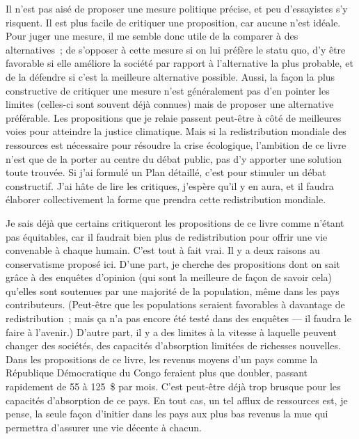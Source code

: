 \documentclass[a5paper,french,openany]{memoir}
\begin{document}
Il n'est pas aisé de proposer une mesure politique précise, et peu d'essayistes s'y risquent. Il est plus facile de critiquer une proposition, car aucune n'est idéale. Pour juger une mesure, il me semble donc utile de la comparer à des alternatives~; de s'opposer à cette mesure si on lui préfère le statu quo, d'y être favorable si elle améliore la société par rapport à l'alternative la plus probable, et de la défendre si c'est la meilleure alternative possible. Aussi, la façon la plus constructive de critiquer une mesure n'est généralement pas d'en pointer les limites (celles-ci sont souvent déjà connues) mais de proposer une alternative préférable. 
Les propositions que je relaie %
passent peut-être 
à côté de meilleures voies pour atteindre la justice climatique. %
Mais si la redistribution mondiale des ressources est nécessaire pour résoudre la crise écologique, l'ambition de ce livre n'est que de la porter au centre du débat public, %
pas d'y apporter une solution toute trouvée. Si j'ai formulé un Plan détaillé, c'est pour stimuler un débat constructif. J'ai hâte de lire les critiques, j'espère qu'il y en aura, et il faudra élaborer collectivement la forme que prendra cette redistribution mondiale. 

Je sais déjà que certains critiqueront les propositions de ce livre comme n'étant pas équitables, car il faudrait bien plus de redistribution pour offrir une vie convenable %
à chaque humain. C'est tout à fait vrai. Il y a deux raisons au conservatisme proposé ici. D'une part, je cherche des propositions dont on sait grâce à des enquêtes d'opinion (qui sont la meilleure de façon de savoir cela) qu'elles sont soutenues par une majorité de la population, même dans les pays contributeurs. (Peut-être que les populations seraient favorables à davantage de redistribution~; mais ça n'a pas encore été testé dans des enquêtes --- il faudra le faire à l'avenir.) D'autre part, il y a des limites à la vitesse à laquelle peuvent changer des sociétés, des capacités d'absorption limitées de richesses nouvelles. Dans les propositions de ce livre, les revenus moyens d'un pays comme la République Démocratique du Congo feraient plus que doubler, passant rapidement de 55 à 125~\$ par mois. %
C'est peut-être déjà trop brusque pour les capacités d'absorption de ce pays. En tout cas, un tel afflux de ressources est, je pense, la seule façon d'initier dans les pays aux plus bas revenus la mue qui permettra d'assurer une vie décente à chacun. 
\end{document}
